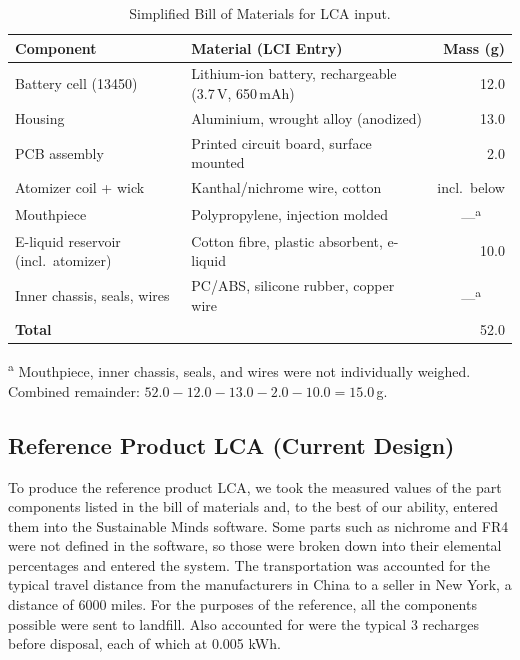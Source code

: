\begin{table}[H]
\centering
\caption{Simplified Bill of Materials for LCA input.}
\label{tab:sbom}
\begin{tabular}{@{}llr@{}}
\toprule
\textbf{Component} & \textbf{Material (LCI Entry)} & \textbf{Mass (g)} \\
\midrule
Battery cell (13450) & Lithium-ion battery, rechargeable (3.7\,V, 650\,mAh) & 12.0 \\
Housing              & Aluminium, wrought alloy (anodized) & 13.0 \\
PCB assembly         & Printed circuit board, surface mounted & 2.0 \\
Atomizer coil + wick & Kanthal/nichrome wire, cotton & \multicolumn{1}{c}{incl.\ below} \\
Mouthpiece           & Polypropylene, injection molded & \multicolumn{1}{c}{---\textsuperscript{a}} \\
E-liquid reservoir (incl.\ atomizer) & Cotton fibre, plastic absorbent, e-liquid & 10.0 \\
Inner chassis, seals, wires & PC/ABS, silicone rubber, copper wire & \multicolumn{1}{c}{---\textsuperscript{a}} \\
\midrule
\textbf{Total}       & & 52.0 \\
\bottomrule
\end{tabular}
\end{table}

\noindent\textsuperscript{a} Mouthpiece, inner chassis, seals, and wires were not individually weighed. Combined remainder: $52.0 - 12.0 - 13.0 - 2.0 - 10.0 = 15.0$\,g.

\subsection{Reference Product LCA (Current Design)}

To produce the reference product LCA, we took the measured values of the part components listed in the bill of materials  and, to the best of our ability, entered them into the Sustainable Minds software.  Some parts such as nichrome and FR4 were not defined in the software, so those were broken down into their elemental percentages and entered the system.   The transportation was accounted for the typical travel distance from the manufacturers in China to a seller in New York, a distance of 6000 miles.  For the purposes of the reference, all the components possible were sent to landfill.  Also accounted for were the typical 3 recharges before disposal, each of which at 0.005 kWh. 

